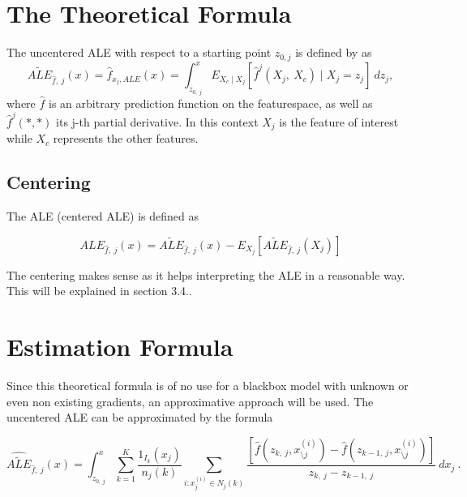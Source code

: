 \documentclass[
]{krantz}
\begin{document}
\hypertarget{the-theoretical-formula}{%
\section{The Theoretical Formula}\label{the-theoretical-formula}}

The uncentered ALE with respect to a starting point \(z_{0, j}\) is defined by \citep{Apley2016} as
\[  \widetilde{ALE}_{\hat{f},~j}(x) = \hat{f}_{x_j,ALE}(x) = \int_{z_{0,~j}}^{x} E_{X_c \mid X_j} [\hat{f}^j(X_j,~X_c)\mid X_j = z_j]~dz_j,\]
where \(\hat{f}\) is an arbitrary prediction function on the featurespace, as well as \(\hat{f}^j(*,*)\) its j-th partial derivative. In this context \(X_j\) is the feature of interest while \(X_c\) represents the other features.

\hypertarget{centering}{%
\subsection{Centering}\label{centering}}

The ALE (centered ALE) is defined as

\[  ALE_{\hat{f},~j}(x) = \widetilde{ALE}_{\hat{f},~j}(x) - E_{X_j}[\widetilde{ALE}_{\hat{f},~j}(X_j)]\]

The centering makes sense as it helps interpreting the ALE in a reasonable way. This will be explained in section 3.4..

\hypertarget{estimation-formula}{%
\section{Estimation Formula}\label{estimation-formula}}

Since this theoretical formula is of no use for a blackbox model with unknown or even non existing gradients, an approximative approach will be used.
The uncentered ALE can be approximated by the formula

\[ \widehat{\widetilde{ALE}}_{\hat{f},~j}(x) = \int_{z_{0,~j}}^{x} \sum_{k=1}^{K}    \frac{1_{I_k}(x_j)}{n_j(k)}\sum_{i:x_j^{(i)}\in N_j(k)} \frac{[\hat{f}(z_{k,~j}, x_{\setminus j}^{(i)})-\hat{f}(z_{k-1,~j}, x_{\setminus j}^{(i)})]}{z_{k,~j}-z_{k-1,~j}}~dx_j~.  \]
\end{document}
